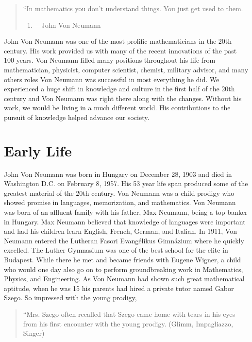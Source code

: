 \documentclass[12pt]{article}
\begin{document}
\pagestyle{fancy}  \chead{}
\lfoot{} \cfoot{} \rfoot{}

\begin{quotation}
	``In mathematics you don't understand things. You just get used to them.
	\begin{enumerate}
		\item[] ---John Von Neumann
	\end{enumerate}
\end{quotation} 

John Von Neumann was one of the most prolific mathematicians in the 20th century. His work provided us with many of the recent innovations of the past 100 years. Von Neumann filled many positions throughout his life from mathematician, physicist, computer scientist, chemist, military advisor, and many others roles Von Neumann was successful in most everything he did. We experienced a huge shift in knowledge and culture in the first half of the 20th century and Von Neumann was right there along with the changes. Without his work, we would be living in a much different world. His contributions to the pursuit of knowledge helped advance our society.

\section*{Early Life}
John Von Neumann was born in Hungary on December 28, 1903 and died in Washington D.C.  on February 8, 1957. His 53 year life span produced some of the greatest material of the 20th century. Von Neumann was a child prodigy who showed promise in languages, memorization, and mathematics. Von Neumann was born of an affluent family with his father, Max Neumann, being a top banker in Hungary. Max Neumann believed that knowledge of languages were important and had his children learn English, French, German, and Italian. In 1911, Von Neumann entered the Lutheran Fasori Evangélikus Gimnázium where he quickly excelled. The Luther Gymnasium was one of the best school for the elite in Budapest. While there he met and became friends with Eugene Wigner, a child who would one day also go on to perform groundbreaking work in Mathematics, Physics, and Engineering. As Von Neumann had shown such great mathematical aptitude, when he was 15 his parents had hired a private tutor named Gabor Szego. So impressed with the young prodigy,

\begin{quotation}
	``Mrs. Szego often recalled that Szego came home with tears in his eyes from his first encounter with the young prodigy. (Glimm, Impagliazzo, Singer)
\end{quotation}
\end{document}
